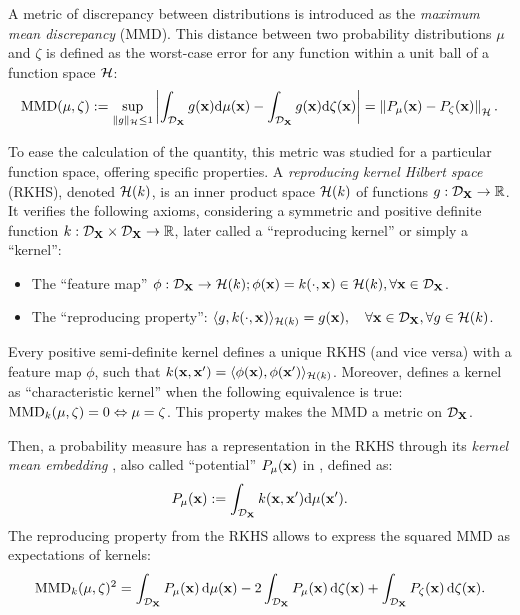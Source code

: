A metric of discrepancy between distributions is introduced as the \emph{maximum mean discrepancy} (MMD). 
This distance between two probability distributions $\mu$ and $\zeta$ is defined as the worst-case error for any function within a unit ball of a function space $\mathcal{H}$:
\begin{equation}
    \MMD(\mu, \zeta) := %
    \sup_{\lVert g \lVert_{\iH} \leq 1}
            \left | \int_{\iD_{\bX}} g(\bx) \dd \mu(\bx) - \int_{\iD_{\bX}} g(\bx) \dd \zeta(\bx) \right| = \left\lVert P_{\mu}(\bx) - P_{\zeta}(\bx) \right\lVert_{\iH}.
    \label{eq:mmd}  
\end{equation}

To ease the calculation of the quantity, this metric was studied for a particular function space, offering specific properties.
A \emph{reproducing kernel Hilbert space} (RKHS), denoted $\mathcal{H}(k)$, is an inner product space $\mathcal{H}(k)$ of functions $g:\mathcal{D}_{{\bf X}} \rightarrow \mathbb{R}$.
It verifies the following axioms, considering a symmetric and positive definite function $k: \mathcal{D}_{{\bf X}} \times \mathcal{D}_{{\bf X}} \rightarrow \mathbb{R}$, later called a ``reproducing kernel'' or simply a ``kernel'': 
\begin{itemize}
    \item The ``feature map'' $\phi : \mathcal{D}_{{\bf X}} \to \mathcal{H}(k); \phi({\bf x}) = k(\cdot, {\bf x}) \in \mathcal{H}(k), \forall {\bf x} \in \mathcal{D}_{{\bf X}}$.
    \item The ``reproducing property'': $\langle g, k(\cdot, {\bf x}) \rangle_{\mathcal{H}(k)} = g({\bf x}), \quad \forall {\bf x} \in \mathcal{D}_{{\bf X}}, \forall g \in \mathcal{H}(k)$.
\end{itemize}
Every positive semi-definite kernel defines a unique RKHS (and vice versa) with a feature map $\phi$, such that $k({\bf x}, {\bf x}') = \langle \phi({\bf x}), \phi({\bf x}') \rangle_{\mathcal{H}(k)}$.
Moreover, \cite{sriperumbudur_2010} defines a kernel as ``characteristic kernel'' when the following equivalence is true: $\mathrm{MMD}_k(\mu, \zeta) = 0 \Leftrightarrow \mu = \zeta$. 
This property makes the MMD a metric on $\mathcal{D}_{{\bf X}}$.

Then, a probability measure has a representation in the RKHS through its \emph{kernel mean embedding} \citep{sejdinovic_2013}, also called ``potential'' $P_{\mu}({\bf x})$ in \cite{pronzato_zhigljavsky_2020}, defined as:
\begin{equation}
   P_{\mu}({\bf x}) := \int_{\mathcal{D}_{{\bf X}}} k({\bf x}, {\bf x}') \mathrm{d} \mu({\bf x}').
\end{equation}
The reproducing property from the RKHS allows to express the squared MMD as expectations of kernels:
\begin{equation}\label{eq:mmd2}
    \mathrm{MMD}_k(\mu, \zeta)^2 = \int_{\mathcal{D}_{{\bf X}}} P_{\mu}({\bf x})\, \mathrm{d}\mu({\bf x}) - 2 \int_{\mathcal{D}_{{\bf X}}} P_{\mu}({\bf x}) \, \mathrm{d}\zeta({\bf x}) + \int_{\mathcal{D}_{{\bf X}}} P_{\zeta}({\bf x})\, \mathrm{d}\zeta({\bf x}).
\end{equation}

